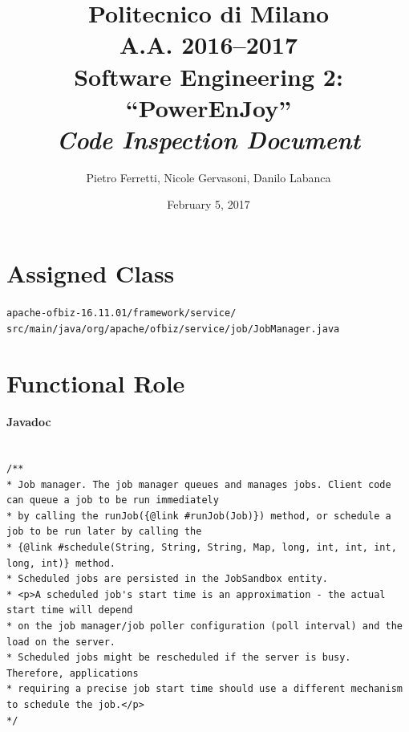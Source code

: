 \documentclass[english]{article}
\begin{document}
\title{Politecnico di Milano\\
 A.A. 2016–2017 \\
Software Engineering 2: “PowerEnJoy” \\
\emph{Code Inspection Document}}

\author{Pietro Ferretti, Nicole Gervasoni, Danilo Labanca}
\date{February 5, 2017}
\maketitle

\newpage

\tableofcontents{}

\newpage

\section{Assigned Class}

\texttt{apache-ofbiz-16.11.01/framework/service/\\
\hspace*{1cm}src/main/java/org/apache/ofbiz/service/job/JobManager.java}

\section{Functional Role}%

\paragraph{Javadoc}

\begin{lstlisting}

/**
* Job manager. The job manager queues and manages jobs. Client code can queue a job to be run immediately
* by calling the runJob({@link #runJob(Job)}) method, or schedule a job to be run later by calling the
* {@link #schedule(String, String, String, Map, long, int, int, int, long, int)} method.
* Scheduled jobs are persisted in the JobSandbox entity.
* <p>A scheduled job's start time is an approximation - the actual start time will depend
* on the job manager/job poller configuration (poll interval) and the load on the server.
* Scheduled jobs might be rescheduled if the server is busy. Therefore, applications
* requiring a precise job start time should use a different mechanism to schedule the job.</p>
*/

\end{lstlisting}
\end{document}
